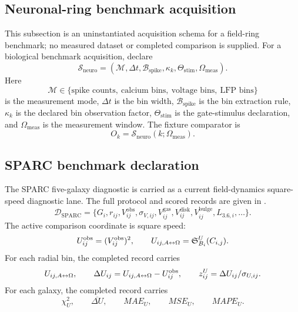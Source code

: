 
\subsection{Neuronal-ring benchmark acquisition}\label{manual:registry:neuronal-benchmark-acquisition}
This subsection is an uninstantiated acquisition schema for a field-ring benchmark; no measured dataset or completed comparison is supplied. For a biological benchmark acquisition, declare
\[
\mathcal S_{\mathrm{neuro}}
=
(\mathcal M,\Delta t,\mathcal B_{\mathrm{spike}},\kappa_k,\Theta_{\mathrm{stim}},\Omega_{\mathrm{meas}}).
\]
Here
\[
\mathcal M\in
\{\text{spike counts},\ \text{calcium bins},\ \text{voltage bins},\ \text{LFP bins}\}
\]
is the measurement mode, \(\Delta t\) is the bin width, \(\mathcal B_{\mathrm{spike}}\) is the bin extraction rule, \(\kappa_k\) is the declared bin observation factor, \(\Theta_{\mathrm{stim}}\) is the gate-stimulus declaration, and \(\Omega_{\mathrm{meas}}\) is the measurement window.
The fixture comparator is
\[
O_k=\mathcal S_{\mathrm{neuro}}(k;\Omega_{\mathrm{meas}}).
\]




\subsection{SPARC benchmark declaration}\label{manual:registry:sparc}
The SPARC five-galaxy diagnostic is carried as a current field-dynamics square-speed diagnostic lane. The full protocol and scored records are given in .
\[
\mathcal D_{\mathrm{SPARC}}
=
\{G_i,r_{ij},V^{\mathrm{obs}}_{ij},\sigma_{V,ij},V^{\mathrm{gas}}_{ij},V^{\mathrm{disk}}_{ij},V^{\mathrm{bulge}}_{ij},L_{3.6,i},\ldots\}.
\]
The active comparison coordinate is square speed:
\[
U^{\mathrm{obs}}_{ij}=(V^{\mathrm{obs}}_{ij})^2,
\qquad
U_{ij,A{\leftrightarrow}\Omega}=\mathfrak S^U_{B_i}(C_{i,j}).
\]
For each radial bin, the completed record carries
\[
U_{ij,A{\leftrightarrow}\Omega},\qquad
\Delta U_{ij}=U_{ij,A{\leftrightarrow}\Omega}-U^{\mathrm{obs}}_{ij},\qquad
z^U_{ij}=\Delta U_{ij}/\sigma_{U,ij}.
\]
For each galaxy, the completed record carries
\[
\chi^2_U,\qquad
\overline{\Delta U},\qquad
MAE_U,\qquad
MSE_U,\qquad
MAPE_U.
\]

